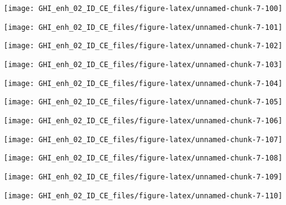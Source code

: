\documentclass[
  10pt,
  a4paper,oneside]{article}
\begin{document}
\begin{center}\texttt{[image: GHI\_enh\_02\_ID\_CE\_files/figure-latex/unnamed-chunk-7-100]} \end{center}

\begin{center}\texttt{[image: GHI\_enh\_02\_ID\_CE\_files/figure-latex/unnamed-chunk-7-101]} \end{center}

\begin{center}\texttt{[image: GHI\_enh\_02\_ID\_CE\_files/figure-latex/unnamed-chunk-7-102]} \end{center}

\begin{center}\texttt{[image: GHI\_enh\_02\_ID\_CE\_files/figure-latex/unnamed-chunk-7-103]} \end{center}

\begin{center}\texttt{[image: GHI\_enh\_02\_ID\_CE\_files/figure-latex/unnamed-chunk-7-104]} \end{center}

\begin{center}\texttt{[image: GHI\_enh\_02\_ID\_CE\_files/figure-latex/unnamed-chunk-7-105]} \end{center}

\begin{center}\texttt{[image: GHI\_enh\_02\_ID\_CE\_files/figure-latex/unnamed-chunk-7-106]} \end{center}

\begin{center}\texttt{[image: GHI\_enh\_02\_ID\_CE\_files/figure-latex/unnamed-chunk-7-107]} \end{center}

\begin{center}\texttt{[image: GHI\_enh\_02\_ID\_CE\_files/figure-latex/unnamed-chunk-7-108]} \end{center}

\begin{center}\texttt{[image: GHI\_enh\_02\_ID\_CE\_files/figure-latex/unnamed-chunk-7-109]} \end{center}

\begin{center}\texttt{[image: GHI\_enh\_02\_ID\_CE\_files/figure-latex/unnamed-chunk-7-110]} \end{center}
\end{document}
